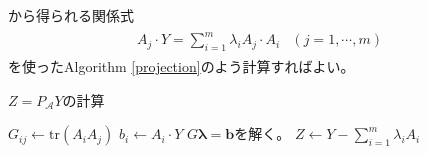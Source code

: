 から得られる関係式
\begin{align*}
  \begin{array}{ll}
    A_j \cdot Y = \displaystyle{\sum_{i = 1}^m} \lambda_i A_j \cdot A_i & (j = 1, \cdots, m)
  \end{array}
\end{align*}
を使ったAlgorithm \ref{projection}のよう計算すればよい。
\begin{algorithm}
  \caption{$Z = P_\mathcal{A} Y$の計算}
  \label{projection}
  \begin{algorithmic}[1]
        \State $G_{i j} \leftarrow \mathrm{tr}(A_i A_j)$
      \EndFor
    \EndFor
      \State $b_i \leftarrow A_i \cdot Y$
    \EndFor
    \State $G {\bm \lambda} = \mathbf{b}$を解く。
    \State \Return $Z \leftarrow Y - \displaystyle{\sum_{i = 1}^m \lambda_i A_i}$
  \end{algorithmic}
\end{algorithm}

